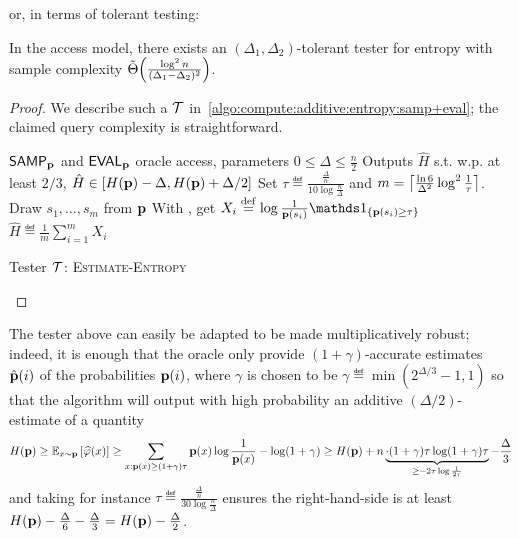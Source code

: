 \noindent or, in terms of tolerant testing:
\begin{corollary}\label{corollary:tolerant:tester:entropy}
In the \pdfsamp access model, there exists an $(\Delta_1, \Delta_2)$-tolerant tester for entropy with sample complexity $\tildeTheta{\frac{\log^2 n}{(\Delta_1-\Delta_2)^2}}$.
\end{corollary}
\begin{proof}
  We describe such a $\mathcal{T}$ in~\cref{algo:compute:additive:entropy:samp+eval}; the claimed query complexity is straightforward.
  \vspace{-2ex}
  \begin{algorithm}[h!]
    \begin{algorithmic}
      \Require ${\sf SAMP}_{\mathbf{p}}$ and ${\sf EVAL}_{\mathbf{p}}$ oracle access, parameters $0\leq \Delta \leq \frac{n}{2}$
      \Ensure Outputs $\hat{H}$ s.t. w.p. at least $2/3$, $\hat{H}\in[H(\mathbf{p})-\Delta, H(\mathbf{p})+\Delta/2]$
      \State Set $\tau\eqdef\frac{\frac{\Delta}{n}}{10\log \frac{n}{\Delta}}$ and $m=\left\lceil \frac{\ln 6}{\Delta^2}\log^2\frac{1}{\tau} \right\rceil$.
      \State Draw $s_1,\dots,s_m$ from $\mathbf{p}$
        \State With \EVAL, get $X_i \eqdef \log\frac{1}{\D(s_i)}\indic{\D(s_i) \geq \tau}$
      \EndFor
      \State\Return $\hat{H}\eqdef \frac{1}{m} \sum_{i=1}^m X_i$
    \end{algorithmic}
    \caption{\label{algo:compute:additive:entropy:samp+eval}Tester $\mathcal{T}$: \textsc{Estimate-Entropy} }
  \end{algorithm}
\end{proof}
  \begin{remark}
    The tester above can easily be adapted to be made multiplicatively robust; indeed, it is enough that the \EVAL oracle only provide $(1+\gamma)$-accurate estimates $\hat{\mathbf{p}}(i)$ of the probabilities $\mathbf{p}(i)$, where $\gamma$ is chosen to be $\gamma\eqdef \min(2^{\Delta/3}-1, 1)$
    so that the algorithm will output with high probability an additive $(\Delta/2)$-estimate of a quantity
    \[
    H(\D) \geq \shortexpect_{x\sim \D}\left[ \widehat{\varphi}(x) \right] \geq \sum_{x:\D(x) \geq (1+\gamma)\tau} \D(x)\log\frac{1}{\D(x)} - \log(1+\gamma) 
    \geq  H(\D) + n\underbrace{\cdot(1+\gamma)\tau\log(1+\gamma)\tau}_{\geq -2\tau\log\frac{1}{2\tau}} - \frac{\Delta}{3}
    \vspace{-\baselineskip}\]
    and taking for instance $\tau\eqdef\frac{\frac{\Delta}{n}}{30\log \frac{n}{\Delta}}$ ensures the right-hand-side is at least $H(\mathbf{p})-\frac{\Delta}{6}-\frac{\Delta}{3} = H(\mathbf{p})-\frac{\Delta}{2}$.
  \end{remark}

